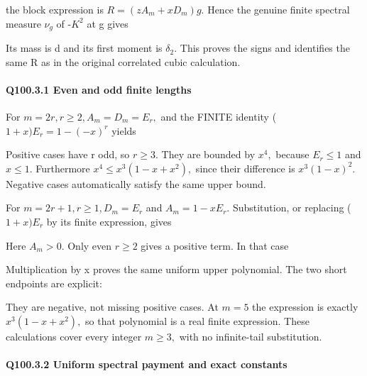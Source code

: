 
the block expression is \(R=(zA_m+xD_m)g.\) Hence the genuine finite
spectral measure \(\nu_g\) of -\(K^2\) at g gives


Its mass is d and its first moment is \(\delta_2.\) This proves the signs and
identifies the same R as in the original correlated cubic calculation.

\paragraph{Q100.3.1 Even and odd finite lengths}

For \(m=2r,\allowbreak  r\ge 2,\allowbreak  A_m=D_m=E_r,\allowbreak \) and the FINITE identity
(\(1+x)E_r=1-(-x)^r\) yields


Positive cases have r odd, so \(r\ge 3.\) They are bounded by \(x^4,\allowbreak \)
because \(E_r\le 1\) and \(x\le 1.\) Furthermore
\(x^4\le x^3(1-x+x^2),\allowbreak \) since their difference is \(x^3(1-x)^2.\)
Negative cases automatically satisfy the same upper bound.

For \(m=2r+1,\allowbreak  r\ge 1,\allowbreak  D_m=E_r\) and \(A_m=1-xE_r.\) Substitution, or replacing
(\(1+x)E_r\) by its finite expression, gives


Here \(A_m>0.\) Only even \(r\ge 2\) gives a positive term. In that case


Multiplication by x proves the same uniform upper polynomial. The two
short endpoints are explicit:


They are negative, not missing positive cases. At \(m=5\) the expression
is exactly \(x^3(1-x+x^2),\allowbreak \) so that polynomial is a real finite expression.
These calculations cover every integer \(m\ge 3,\allowbreak \) with no infinite-tail
substitution.

\paragraph{Q100.3.2 Uniform spectral payment and exact constants}

